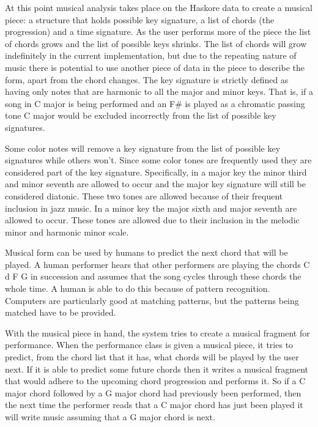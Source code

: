 \documentclass[12pt]{ucthesis}
\begin{document}
{At this point musical analysis takes place on the Haskore data to create a musical piece: a structure that holds possible key signature, a list of chords (the progression) and a time signature. As the user performs more of the piece the list of chords grows and the list of possible keys shrinks. The list of chords will grow indefinitely in the current implementation, but due to the repeating nature of music there is potential to use another piece of data in the piece to describe the form, apart from the chord changes. The key signature is strictly defined as having only notes that are harmonic to all the major and minor keys. That is, if a song in C major is being performed and an F\# is played as a chromatic passing tone C major would be excluded incorrectly from the list of possible key signatures. 

Some color notes will remove a key signature from the list of possible key signatures while others won't. Since some color tones are frequently used they are considered part of the key signature.  Specifically, in a major key the minor third and minor seventh are allowed to occur and the major key signature will still be considered diatonic. These two tones are allowed because of their frequent inclusion in jazz music. In a minor key the major sixth and major seventh are allowed to occur. These tones are allowed due to their inclusion in the melodic minor and harmonic minor scale. 

Musical form can be used by humans to predict the next chord that will be played. A human performer hears that other performers are playing the chords C d F G in succession and assumes that the song cycles through these chords the whole time. A human is able to do this because of pattern recognition. Computers are particularly good at matching patterns, but the patterns being matched have to be provided.

With the musical piece in hand, the system tries to create a musical fragment for performance. When the performance class is given a musical piece, it tries to predict, from the chord list that it has, what chords will be played by the user next. If it is able to predict some future chords then it writes a musical fragment that would adhere to the upcoming chord progression and performs it. So if a C major chord followed by a G major chord had previously been performed, then the next time the performer reads that a C major chord has just been played it will write music assuming that a G major chord is next. 

}
\end{document}
